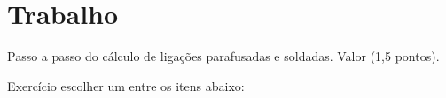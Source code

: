 \cabecalho

\section*{Trabalho}

Passo a passo do cálculo de ligações parafusadas e soldadas. Valor (1,5 pontos).

Exercício escolher um entre os itens abaixo:

